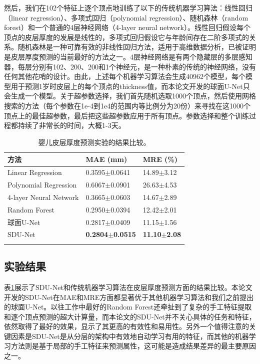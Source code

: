 然后，我们在102个特征上逐个顶点地训练了以下的传统机器学习算法：线性回归（linear regression）、多项式回归（polynomial regression）、随机森林（random forest）和一个普通的4层神经网络（4-layer neural network）。线性回归假设每个顶点的皮层厚度的发展是线性的，多项式回归假设它与年龄间存在二阶多项式的关系。随机森林是一种可靠有效的非线性回归方法，适用于高维数据分析，已被证明是皮层厚度预测的当前最好的方法之一\cite{meng2017can}。4层神经网络是有两个隐藏层的多层感知器，每层分别有102、200、200和1个神经元，是一种朴素的传统的神经网络，没有任何其他花哨的设计。由此，上述每个机器学习算法会生成40962个模型，每个模型用于预测1岁时皮层上的每个顶点的thickness值，而本论文开发的球面U-Net只会生成一个模型。关于超参数选择，我们首先随机选取1000个顶点，然后使用网格搜索的方法（每个参数在1e-4到1e4的范围内等比例分为20份）来寻找在这1000个顶点上的最佳超参数，最后把这些超参数应用于所有顶点。参数选择和整个训练过程都持续了非常长的时间，大概1-3天。

\begin{table}[t]
		\caption{婴儿皮层厚度预测实验的结果比较。}
		\label{tab:皮层厚度预测的结果}
		\centering
		\begin{tabularx}{0.8\linewidth}{l X<{\centering} X<{\centering}}
			\Xhline{2\arrayrulewidth}
			方法                                                &              MAE (mm)          &  MRE (\%)  \\
			\hline   
			Linear Regression                                      &       0.3595$\pm$0.0641        & 14.89$\pm$3.12 \\
			Polynomial Regression                                  &     0.6067$\pm$0.0901          & 26.63$\pm$4.53\\
			4-layer Neural Network                                 &    0.3665$\pm$0.0603           & 14.67$\pm$2.89\\
			Random Forest \cite{meng2017can}                     &    0.2950$\pm$0.0394           &  12.42$\pm$2.01 \\
			球面U-Net \cite{zhao2019spherical_ipmi}        &    0.2817$\pm$0.0409           &   11.15$\pm$1.56  \\
			SDU-Net                                                &   \textbf{0.2804$\pm$0.0515}   &  \textbf{11.10$\pm$2.08}  \\
			\Xhline{2\arrayrulewidth}
		\end{tabularx}
\end{table}

\subsection{实验结果}
表\ref{tab:皮层厚度预测的结果}展示了SDU-Net和传统机器学习算法在皮层厚度预测方面的结果比较。本论文开发的SDU-Net在MAE和MRE方面都显著优于其他机器学习算法和我们之前提出的球面U-Net。以往工作中最好的Random Forest还牵扯到了复杂的手工特征提取和逐个顶点预测的超大计算量，而本论文的SDU-Net并不关心具体的任务和特征，依然取得了最好的效果，显示了其更高的有效性和易用性。另外一个值得注意的关键因素是SDU-Net是从分层的架构中有效地自动学习有用的特征，而其他的机器学习方法则是基于局部的手工特征来预测属性，这可能是造成结果差异的最主要原因之一。

